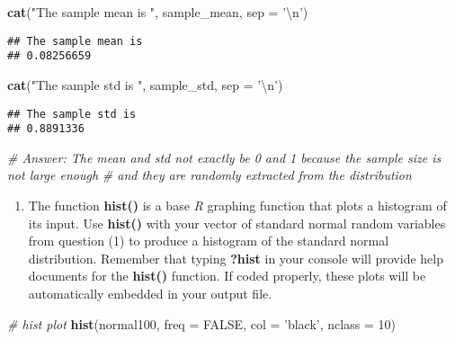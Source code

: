 \documentclass[]{article}
\newenvironment{Shaded}{\begin{snugshade}}{\end{snugshade}}
\newcommand{\KeywordTok}[1]{\textcolor[rgb]{0.13,0.29,0.53}{\textbf{#1}}}
\newcommand{\DataTypeTok}[1]{\textcolor[rgb]{0.13,0.29,0.53}{#1}}
\newcommand{\DecValTok}[1]{\textcolor[rgb]{0.00,0.00,0.81}{#1}}
\newcommand{\CharTok}[1]{\textcolor[rgb]{0.31,0.60,0.02}{#1}}
\newcommand{\StringTok}[1]{\textcolor[rgb]{0.31,0.60,0.02}{#1}}
\newcommand{\CommentTok}[1]{\textcolor[rgb]{0.56,0.35,0.01}{\textit{#1}}}
\newcommand{\OtherTok}[1]{\textcolor[rgb]{0.56,0.35,0.01}{#1}}
\newcommand{\NormalTok}[1]{#1}
\providecommand{\tightlist}{%
  \setlength{\itemsep}{0pt}\setlength{\parskip}{0pt}}
\begin{document}
\begin{Shaded}
\begin{Highlighting}[]
\KeywordTok{cat}\NormalTok{(}\StringTok{"The sample mean is "}\NormalTok{, sample_mean, }\DataTypeTok{sep =} \StringTok{'}\CharTok{\textbackslash{}n}\StringTok{'}\NormalTok{)}
\end{Highlighting}
\end{Shaded}

\begin{verbatim}
## The sample mean is 
## 0.08256659
\end{verbatim}

\begin{Shaded}
\begin{Highlighting}[]
\KeywordTok{cat}\NormalTok{(}\StringTok{"The sample std is "}\NormalTok{, sample_std, }\DataTypeTok{sep =} \StringTok{'}\CharTok{\textbackslash{}n}\StringTok{'}\NormalTok{)}
\end{Highlighting}
\end{Shaded}

\begin{verbatim}
## The sample std is 
## 0.8891336
\end{verbatim}

\begin{Shaded}
\begin{Highlighting}[]
\CommentTok{# Answer: The mean and std not exactly be 0 and 1 because the sample size is not large enough }
\CommentTok{# and they are randomly extracted from the distribution}
\end{Highlighting}
\end{Shaded}

\begin{enumerate}
\def\labelenumi{\arabic{enumi})}
\setcounter{enumi}{1}
\tightlist
\item
  The function \textbf{hist()} is a base \emph{R} graphing function that
  plots a histogram of its input. Use \textbf{hist()} with your vector
  of standard normal random variables from question (1) to produce a
  histogram of the standard normal distribution. Remember that typing
  \textbf{?hist} in your console will provide help documents for the
  \textbf{hist()} function. If coded properly, these plots will be
  automatically embedded in your output file.
\end{enumerate}

\begin{Shaded}
\begin{Highlighting}[]
\CommentTok{# hist plot}
\KeywordTok{hist}\NormalTok{(normal100, }\DataTypeTok{freq =} \OtherTok{FALSE}\NormalTok{, }\DataTypeTok{col =} \StringTok{'black'}\NormalTok{, }\DataTypeTok{nclass =} \DecValTok{10}\NormalTok{)}
\end{Highlighting}
\end{Shaded}
\end{document}
